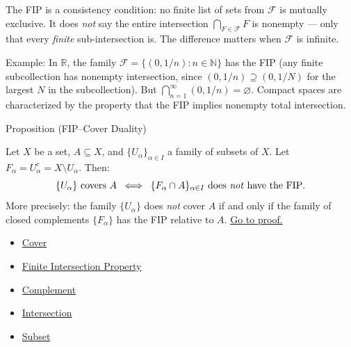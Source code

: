 \begin{remark*}
The FIP is a consistency condition: no finite list of sets from $\mathcal{F}$
is mutually exclusive. It does \emph{not} say the entire intersection
$\bigcap_{F \in \mathcal{F}} F$ is nonempty — only that every \emph{finite}
sub-intersection is. The difference matters when $\mathcal{F}$ is infinite.

Example: In $\mathbb{R}$, the family $\mathcal{F} = \{(0, 1/n) : n \in
\mathbb{N}\}$ has the FIP (any finite subcollection has nonempty intersection,
since $(0, 1/n) \supseteq (0, 1/N)$ for the largest $N$ in the subcollection).
But $\bigcap_{n=1}^\infty (0,1/n) = \varnothing$. Compact spaces are
characterized by the property that the FIP implies nonempty total
intersection.
\end{remark*}


\begin{propositionbox}{Proposition (FIP--Cover Duality)}
\begin{proposition}\label{prop:fip-duality}
Let $X$ be a set, $A \subseteq X$, and $\{U_\alpha\}_{\alpha \in I}$ a
family of subsets of $X$. Let $F_\alpha = U_\alpha^c = X \setminus U_\alpha$.
Then:
\[
\{U_\alpha\} \text{ covers } A
\;\;\Longleftrightarrow\;\;
\{F_\alpha \cap A\}_{\alpha \in I} \text{ does \emph{not} have the FIP}.
\]
More precisely: the family $\{U_\alpha\}$ does \emph{not} cover $A$ if and
only if the family of closed complements $\{F_\alpha\}$ has the FIP relative
to $A$.
\hyperref[prf:fip-duality]{Go to proof.}
\end{proposition}
\end{propositionbox}

\begin{dependencies}
\begin{itemize}
  \item \hyperref[def:cover-full]{Cover}
  \item \hyperref[def:fip]{Finite Intersection Property}
  \item \hyperref[def:complement]{Complement}
  \item \hyperref[def:intersection]{Intersection}
  \item \hyperref[def:subset]{Subset}
\end{itemize}
\end{dependencies}

